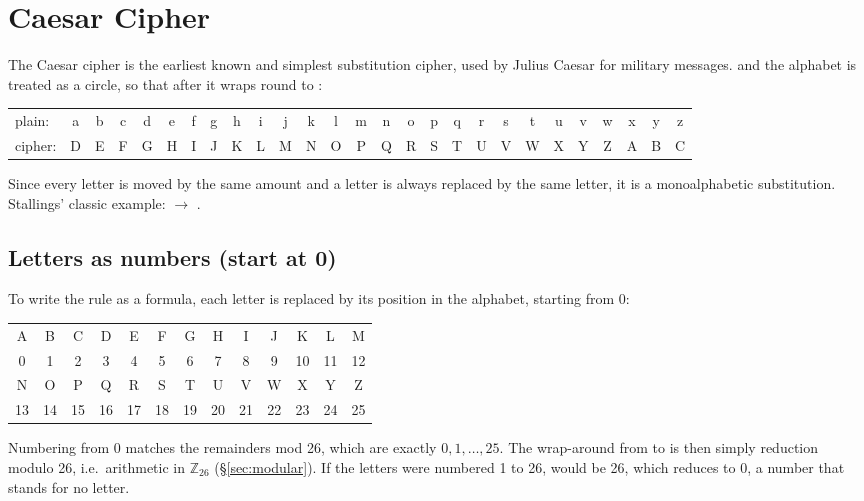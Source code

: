 \section{Caesar Cipher}\label{sec:caesar}

The Caesar cipher is the earliest known and simplest substitution cipher, used by Julius Caesar for military messages.  and the alphabet is treated as a circle, so that after  it wraps round to :
\begin{center}\small\ttfamily\setlength{\tabcolsep}{3.2pt}
\begin{tabular}{@{}l*{26}{c}@{}}
\rmfamily plain: & a&b&c&d&e&f&g&h&i&j&k&l&m&n&o&p&q&r&s&t&u&v&w&x&y&z\\
\rmfamily cipher: & D&E&F&G&H&I&J&K&L&M&N&O&P&Q&R&S&T&U&V&W&X&Y&Z&A&B&C\\
\end{tabular}
\end{center}
Since every letter is moved by the same amount and a letter is always replaced by the same letter, it is a monoalphabetic substitution. Stallings' classic example:  $\to$ .

\subsection{Letters as numbers (start at 0)}
To write the rule as a formula, each letter is replaced by its position in the alphabet, starting from 0:
\begin{center}\small\setlength{\tabcolsep}{4pt}
\begin{tabular}{*{13}{c}}
\toprule
A&B&C&D&E&F&G&H&I&J&K&L&M\\
0&1&2&3&4&5&6&7&8&9&10&11&12\\
\midrule
N&O&P&Q&R&S&T&U&V&W&X&Y&Z\\
13&14&15&16&17&18&19&20&21&22&23&24&25\\
\bottomrule
\end{tabular}
\end{center}
Numbering from 0 matches the remainders mod 26, which are exactly $0,1,\dots,25$. The wrap-around from  to  is then simply reduction modulo 26, i.e.\ arithmetic in $\mathbb{Z}_{26}$ (\S\ref{sec:modular}). If the letters were numbered 1 to 26,  would be 26, which reduces to 0, a number that stands for no letter.

